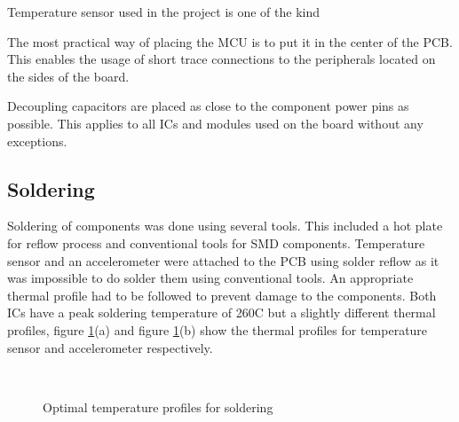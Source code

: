 Temperature sensor used in the project is one of the kind \TODO{}

The most practical way of placing the MCU is to put it in the center of the PCB. This enables the usage of short trace connections to the peripherals located on the sides of the board.

Decoupling capacitors are placed as close to the component power pins as possible. This applies to all ICs and modules used on the board without any exceptions.

\subsection{Soldering}
Soldering of components was done using several tools. This included a hot plate for reflow process and conventional tools for SMD components. Temperature sensor and an accelerometer were attached to the PCB using solder reflow as it was impossible to do solder them using conventional tools. An appropriate thermal profile had to be followed to prevent damage to the components. Both ICs have a peak soldering temperature of 260C but a slightly different thermal profiles, figure \ref{fig:temp_profile_optimal}(a) and figure  \ref{fig:temp_profile_optimal}(b) show the thermal profiles for temperature sensor and accelerometer respectively. 

\begin{figure}
\centering
\mbox{
\quad
{}
}
\caption{Optimal temperature profiles for soldering}
\label{fig:temp_profile_optimal}
\end{figure}

